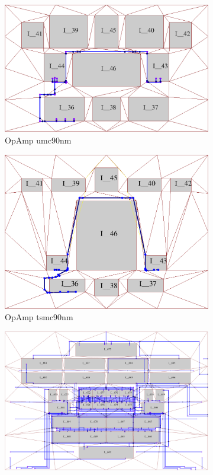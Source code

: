   \begin{figure}[ht]
      \centering
        \begin{subfigure}[t]{0.4\textwidth}
        \includegraphics[width=\textwidth]{Fig/OrigOpamp.eps}
        \caption{OpAmp umc90nm}\label{fig:OrigOpamp}
        \end{subfigure}
        \begin{subfigure}[t]{0.4\textwidth}
        \includegraphics[width=\textwidth]{Fig/OpampProto.eps}
        \caption{OpAmp tsmc90nm}\label{fig:OpampProto}
        \end{subfigure}
        \begin{subfigure}[t]{0.4\textwidth}
        \includegraphics[width=\textwidth]{Fig/OrigVGA.eps}

\end{subfigure}
\end{figure}
